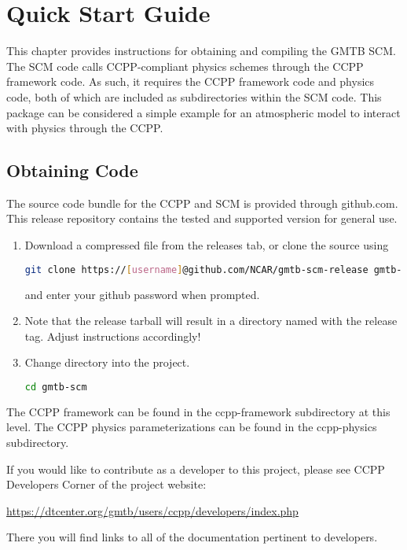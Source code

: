 \chapter{Quick Start Guide}
\label{chapter: quick}

This chapter provides instructions for obtaining and compiling  the GMTB SCM. The SCM code calls CCPP-compliant physics schemes through the CCPP framework code. As such, it requires the CCPP framework code and physics code, both of which are included as subdirectories within the SCM code. This package can be considered a simple example for an atmospheric model to interact with physics through the CCPP.

\section{Obtaining Code}

The source code bundle for the CCPP and SCM is provided through github.com.  This release repository contains the tested and supported version for general use.

\begin{enumerate}
    \item Download a compressed file from the releases tab, or clone the source using
\begin{lstlisting}[language=bash]
git clone https://[username]@github.com/NCAR/gmtb-scm-release gmtb-scm
\end{lstlisting}
    and enter your github password when prompted.
\item Note that the release tarball will result in a directory named with the release tag. Adjust instructions accordingly!
    \item Change directory into the project.
\begin{lstlisting}[language=bash]
cd gmtb-scm
\end{lstlisting}
\end{enumerate}

The CCPP framework can be found in the ccpp-framework subdirectory at this level.  The CCPP physics parameterizations can be found in the ccpp-physics subdirectory.

If you would like to contribute as a developer to this project, please see CCPP Developers Corner of the project website:

\url{https://dtcenter.org/gmtb/users/ccpp/developers/index.php}

There you will find links to all of the documentation pertinent to developers. 

